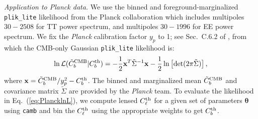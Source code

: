 \documentclass[amsmath, amssymb, reprint, aps]{revtex4-1}
\newcommand{\xv}{\textbf{x}}
\newcommand{\tv}{\bm{\theta}}
\begin{document}
{        \medskip
        \textit{Application to Planck data.} 
        We use the binned and foreground-marginalized \texttt{plik\_lite} likelihood from the Planck collaboration \cite{Aghanim:2015xee} which includes multipoles $30-2508$ for TT power spectrum, and multipoles $30-1996$ for EE power spectrum. We fix the {\it Planck} calibration factor $y_p$ to 1; see Sec.\ C.6.2 of \cite{Aghanim:2015xee}, from which the CMB-only Gaussian \texttt{plik\_lite} likelihood is:
        \begin{align}
            \ln \mathcal{L}(\tilde{C}_b^{\rm CMB}|C_b^{\rm th}) = -\frac{1}{2}\xv^T \tilde{\Sigma}^{-1} \xv -\frac{1}{2} \ln \left[ \det(2\pi \tilde{\Sigma})\right], \label{eq:PlancklnL}
        \end{align}
        where $\xv = \tilde{C}_b^{\rm CMB}/y_p^2 - C_b^{\rm th}$. The binned and marginalized mean $\tilde{C}_b^{\rm CMB}$ and covariance matrix $\tilde{\Sigma}$ are provided by the {\it Planck} team. To evaluate the likelihood in Eq.~(\ref{eq:PlancklnL}), we compute lensed $C_\ell^{\rm th}$ for a given set of parameters $\tv$ using \texttt{camb} \cite{Lewis:1999bs,Howlett:2012mh} and bin the $C_\ell^{\rm th}$ using the appropriate weights to get $C_b^{\rm th}$.
        
}
\end{document}
